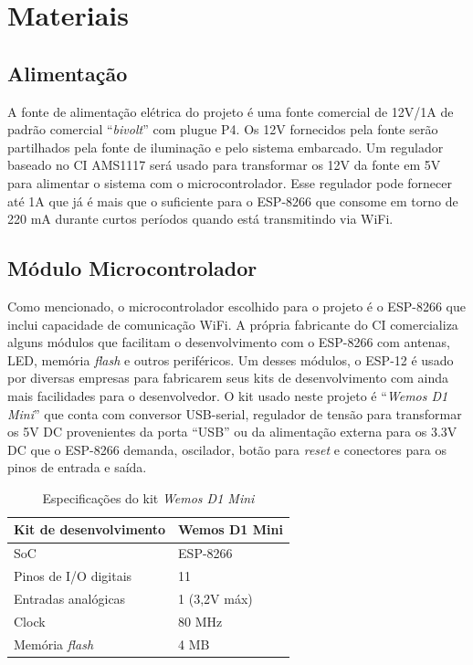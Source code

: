 \section{Materiais}

\subsection{Alimentação}

A fonte de alimentação elétrica do projeto é uma fonte comercial de 12V/1A de padrão comercial “\textit{bivolt}” com plugue P4. Os 12V fornecidos pela fonte serão partilhados pela fonte de iluminação e pelo sistema embarcado. Um regulador baseado no CI AMS1117 será usado para transformar os 12V da fonte em 5V para alimentar o sistema com o microcontrolador. Esse regulador pode fornecer até 1A que já é mais que o suficiente para o ESP-8266 que consome em torno de 220 mA durante curtos períodos quando está transmitindo via WiFi.

\subsection{Módulo Microcontrolador}

Como mencionado, o microcontrolador escolhido para o projeto é o ESP-8266 que inclui capacidade de comunicação WiFi. A própria fabricante do CI comercializa alguns módulos que facilitam o desenvolvimento com o ESP-8266 com antenas, LED, memória \textit{flash} e outros periféricos. Um desses módulos, o ESP-12 é usado por diversas empresas para fabricarem seus kits de desenvolvimento com ainda mais facilidades para o desenvolvedor. O kit usado neste projeto é “\textit{Wemos D1 Mini}” que conta com conversor USB-serial, regulador de tensão para transformar os 5V DC provenientes da porta ``USB'' ou da alimentação externa para os 3.3V DC que o ESP-8266 demanda, oscilador, botão para \textit{reset} e conectores para os pinos de entrada e saída.

\begin{table}
    \centering
    \label{wemos_dados}
    \caption{Especificações do kit \textit{Wemos D1 Mini}}
    \begin{tabular}{ll} 
        \hline
        Kit de desenvolvimento          & Wemos D1 Mini  \\ 
        \hline
        SoC                             & ESP-8266       \\ 
        \hline
        Pinos de I/O digitais           & 11             \\ 
        \hline
        Entradas analógicas             & 1 (3,2V máx)   \\ 
        \hline
        Clock                           & 80 MHz         \\ 
        \hline
        Memória \textit{flash}          & 4 MB           \\
        \hline
    \end{tabular}
\end{table}

